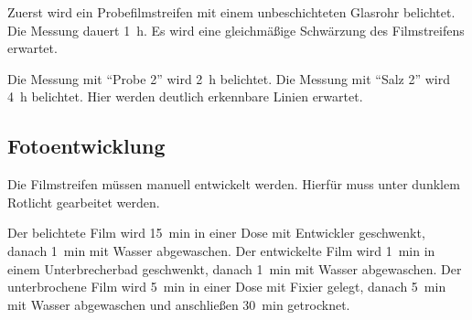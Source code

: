 Zuerst wird ein Probefilmstreifen mit einem unbeschichteten Glasrohr belichtet.
Die Messung dauert \SI{1}{\hour}.
Es wird eine gleichmäßige Schwärzung des Filmstreifens erwartet.

Die Messung mit \enquote{Probe 2} wird \SI{2}{\hour} belichtet.
Die Messung mit \enquote{Salz 2} wird \SI{4}{\hour} belichtet.
Hier werden deutlich erkennbare Linien erwartet.

\subsection{Fotoentwicklung}%
\label{sub:fotoentwicklung}
Die Filmstreifen müssen manuell entwickelt werden.
Hierfür muss unter dunklem Rotlicht gearbeitet werden.

Der belichtete Film wird \SI{15}{\minute} in einer Dose mit Entwickler geschwenkt,
danach \SI{1}{\minute} mit Wasser abgewaschen.
Der entwickelte Film wird \SI{1}{\minute} in einem Unterbrecherbad geschwenkt,
danach \SI{1}{\minute} mit Wasser abgewaschen.
Der unterbrochene Film wird \SI{5}{\minute} in einer Dose mit Fixier gelegt,
danach \SI{5}{\minute} mit Wasser abgewaschen und anschließen \SI{30}{\minute} getrocknet.
